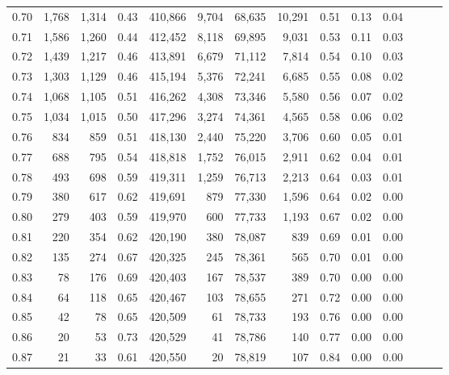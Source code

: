 \begin{tabular}{rrrrrrrrrrrrrr}
0.70 &   1,768 &  1,314 &  0.43 &  410,866 &    9,704 &  68,635 &  10,291 &  0.51 &  0.13 &      0.04 \\
0.71 &   1,586 &  1,260 &  0.44 &  412,452 &    8,118 &  69,895 &   9,031 &  0.53 &  0.11 &      0.03 \\
0.72 &   1,439 &  1,217 &  0.46 &  413,891 &    6,679 &  71,112 &   7,814 &  0.54 &  0.10 &      0.03 \\
0.73 &   1,303 &  1,129 &  0.46 &  415,194 &    5,376 &  72,241 &   6,685 &  0.55 &  0.08 &      0.02 \\
0.74 &   1,068 &  1,105 &  0.51 &  416,262 &    4,308 &  73,346 &   5,580 &  0.56 &  0.07 &      0.02 \\
0.75 &   1,034 &  1,015 &  0.50 &  417,296 &    3,274 &  74,361 &   4,565 &  0.58 &  0.06 &      0.02 \\
0.76 &     834 &    859 &  0.51 &  418,130 &    2,440 &  75,220 &   3,706 &  0.60 &  0.05 &      0.01 \\
0.77 &     688 &    795 &  0.54 &  418,818 &    1,752 &  76,015 &   2,911 &  0.62 &  0.04 &      0.01 \\
0.78 &     493 &    698 &  0.59 &  419,311 &    1,259 &  76,713 &   2,213 &  0.64 &  0.03 &      0.01 \\
0.79 &     380 &    617 &  0.62 &  419,691 &      879 &  77,330 &   1,596 &  0.64 &  0.02 &      0.00 \\
0.80 &     279 &    403 &  0.59 &  419,970 &      600 &  77,733 &   1,193 &  0.67 &  0.02 &      0.00 \\
0.81 &     220 &    354 &  0.62 &  420,190 &      380 &  78,087 &     839 &  0.69 &  0.01 &      0.00 \\
0.82 &     135 &    274 &  0.67 &  420,325 &      245 &  78,361 &     565 &  0.70 &  0.01 &      0.00 \\
0.83 &      78 &    176 &  0.69 &  420,403 &      167 &  78,537 &     389 &  0.70 &  0.00 &      0.00 \\
0.84 &      64 &    118 &  0.65 &  420,467 &      103 &  78,655 &     271 &  0.72 &  0.00 &      0.00 \\
0.85 &      42 &     78 &  0.65 &  420,509 &       61 &  78,733 &     193 &  0.76 &  0.00 &      0.00 \\
0.86 &      20 &     53 &  0.73 &  420,529 &       41 &  78,786 &     140 &  0.77 &  0.00 &      0.00 \\
0.87 &      21 &     33 &  0.61 &  420,550 &       20 &  78,819 &     107 &  0.84 &  0.00 &      0.00 \\

\end{tabular}
